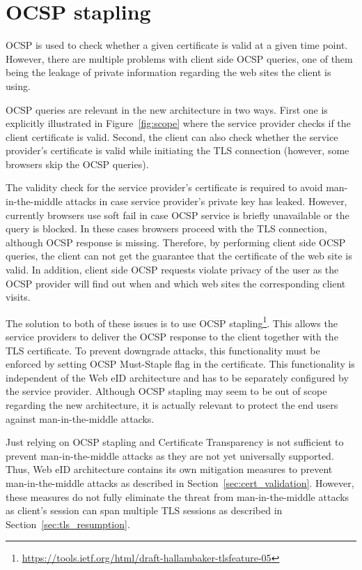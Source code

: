 \section{OCSP stapling}
\label{sec:ocsp_stapling}
OCSP is used to check whether a given certificate is valid at a given time point. However, there are multiple problems with client side OCSP queries, one of them being the leakage of private information regarding the web sites the client is using.

OCSP queries are relevant in the new architecture in two ways. First one is explicitly illustrated in Figure~\ref{fig:scope} where the service provider checks if the client certificate is valid. Second, the client can also check whether the service provider's certificate is valid while initiating the TLS connection (however, some browsers skip the OCSP queries).

The validity check for the service provider's certificate is required to avoid man-in-the-middle attacks in case service provider's private key has leaked. However, currently browsers use soft fail in case OCSP service is briefly unavailable or the query is blocked. In these cases browsers proceed with the TLS connection, although OCSP response is missing. Therefore, by performing client side OCSP queries, the client can not get the guarantee that the certificate of the web site is valid. In addition, client side OCSP requests violate privacy of the user as the OCSP provider will find out when and which web sites the corresponding client visits.

The solution to both of these issues is to use OCSP stapling\footnote{\url{https://tools.ietf.org/html/draft-hallambaker-tlsfeature-05}}. This allows the service providers to deliver the OCSP response to the client together with the TLS certificate. To prevent downgrade attacks, this functionality must be enforced by setting OCSP Must-Staple flag in the certificate. This functionality is independent of the Web eID architecture and has to be separately configured by the service provider. Although OCSP stapling may seem to be out of scope regarding the new architecture, it is actually relevant to protect the end users against man-in-the-middle attacks.

Just relying on OCSP stapling and Certificate Transparency is not sufficient to prevent man-in-the-middle attacks as they are not yet universally supported. Thus, Web eID architecture contains its own mitigation measures to prevent man-in-the-middle attacks as described in Section~\ref{sec:cert_validation}. However, these measures do not fully eliminate the threat from man-in-the-middle attacks as client's session can span multiple TLS sessions as described in Section~\ref{sec:tls_resumption}.


